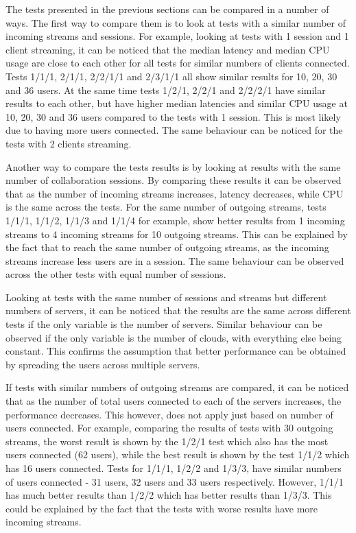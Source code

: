 The tests presented in the previous sections can be compared in a number of ways. The first way to compare them is to look at tests with a similar number of incoming streams and sessions. For example, looking at tests with 1 session and 1 client streaming, it can be noticed that the median latency and median CPU usage are close to each other for all tests for similar numbers of clients connected. Tests 1/1/1, 2/1/1, 2/2/1/1 and 2/3/1/1 all show similar results for 10, 20, 30 and 36 users. At the same time tests 1/2/1, 2/2/1 and 2/2/2/1 have similar results to each other, but have higher median latencies and similar CPU usage at 10, 20, 30 and 36 users compared to the tests with 1 session. This is most likely due to having more users connected. The same behaviour can be noticed for the tests with 2 clients streaming.

Another way to compare the tests results is by looking at results with the same number of collaboration sessions. By comparing these results it can be observed that as the number of incoming streams increases, latency decreases, while CPU is the same across the tests. For the same number of outgoing streams, tests 1/1/1, 1/1/2, 1/1/3 and 1/1/4 for example, show better results from 1 incoming streams to 4 incoming streams for 10 outgoing streams. This can be explained by the fact that to reach the same number of outgoing streams, as the incoming streams increase less users are in a session. The same behaviour can be observed across the other tests with equal number of sessions.

Looking at tests with the same number of sessions and streams but different numbers of servers, it can be noticed that the results are the same across different tests if the only variable is the number of servers. Similar behaviour can be observed if the only variable is the number of clouds, with everything else being constant. This confirms the assumption that better performance can be obtained by spreading the users across multiple servers.

If tests with similar numbers of outgoing streams are compared, it can be noticed that as the number of total users connected to each of the servers increases, the performance decreases. This however, does not apply just based on number of users connected. For example, comparing the results of tests with 30 outgoing streams, the worst result is shown by the 1/2/1 test which also has the most users connected (62 users), while the best result is shown by the test 1/1/2 which has 16 users connected. Tests for 1/1/1, 1/2/2 and 1/3/3, have similar numbers of users connected - 31 users, 32 users and 33 users respectively. However, 1/1/1 has much better results than 1/2/2 which has better results than 1/3/3. This could be explained by the fact that the tests with worse results have more incoming streams.

